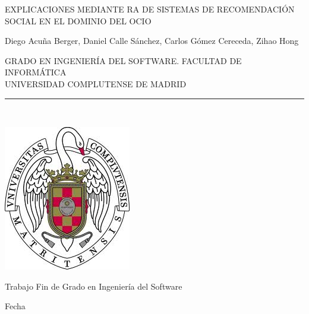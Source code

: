 \begin{center}

   \vspace{1cm}


   {\Large EXPLICACIONES MEDIANTE RA DE SISTEMAS DE RECOMENDACIÓN SOCIAL EN EL DOMINIO DEL OCIO}\\

   \vspace{0.5cm}



   \vspace{0.5cm}



    Diego Acuña Berger, Daniel Calle Sánchez, Carlos Gómez Cereceda, Zihao Hong\\

   \vspace{0.5cm}




   GRADO EN INGENIERÍA DEL SOFTWARE. FACULTAD DE INFORMÁTICA\\
   UNIVERSIDAD COMPLUTENSE DE MADRID \\


   \vspace{0.65cm}
   \rule{2in}{0.5pt}\\
   \vspace{0.85cm}

  \includegraphics[height=2.5in]{figures/escudo.jpg}
  

   \vspace{0.5cm}
Trabajo Fin de Grado en Ingeniería del Software

   \vspace{0.5cm}






  Fecha\\
   \vspace{1cm}

\end{center}

